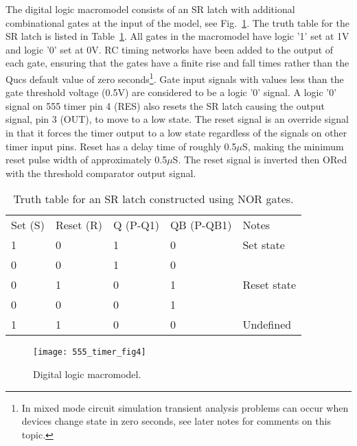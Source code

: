 \addvspace{12pt}




The digital logic macromodel consists of an SR latch with additional combinational gates at the input of the model, see Fig.~\ref{fig:555_timer_fig4}.  The truth table for the SR latch is listed in Table~\ref{tab:tab1}.  All gates in the macromodel have logic '1' set at 1V and logic '0' set at 0V. RC timing networks have been added to the output of each gate, ensuring that the gates have a finite rise and fall times rather than the Qucs default value of zero seconds\footnote{In mixed mode circuit simulation transient analysis problems can occur when devices change state in zero seconds, see later notes for comments on this topic.}. Gate input signals with values less than the gate threshold voltage (0.5V) are considered to be a logic '0' signal. A logic '0' signal on 555 timer pin 4 (RES) also resets the SR latch causing the output signal, pin 3 (OUT), to move to a low state. The reset signal is an override signal in that it forces the timer output to a low state regardless of the signals on other timer input pins. Reset has a delay time of roughly 0.5$\mu$S, making the minimum reset pulse width of approximately 0.5$\mu$S. The reset signal is inverted then ORed with the threshold comparator output signal.  



\begin{table}
\centering
\begin{center}
\begin{tabular}{lllll}
Set (S) & Reset (R) & Q (P-Q1) & QB (P-QB1) & Notes \\ 
1 & 0 & 1 & 0 & Set state \\ 
0 & 0 & 1 & 0 &   \\ 
0 & 1 & 0 & 1 & Reset state \\ 
0 & 0 & 0 & 1 &  \\ 
1 & 1 & 0 & 0 & Undefined
\end{tabular}
\end{center}

\caption{Truth table for an SR latch constructed using NOR gates.}
\label{tab:tab1}
\end{table}
\FloatBarrier

\begin{figure}[ht]
  \centering
  \texttt{[image: 555\_timer\_fig4]}
  \caption{Digital logic macromodel.}
  \label{fig:555_timer_fig4} 
\end{figure} 
\FloatBarrier
{}

